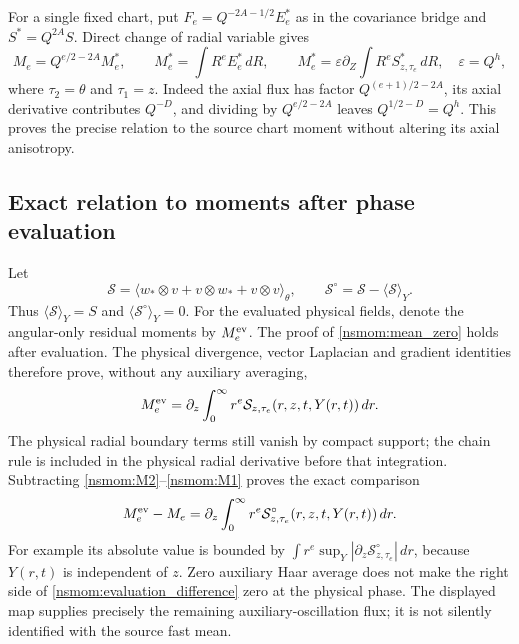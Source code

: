 \documentclass[11pt]{article}
\begin{document}
For a single fixed chart, put
$F_e=Q^{-2A-1/2}E_e^*$ as in the covariance bridge and
$S^*=Q^{2A}S$. Direct change of radial variable gives
\[
 M_e=Q^{e/2-2A}M_e^*,\qquad
 M_e^*=\int R^eE_e^*\,dR,
 \qquad
 M_e^*=\varepsilon\partial_Z\int R^e S^*_{z,\tau_e}\,dR,
 \quad\varepsilon=Q^h,
\]
where $\tau_2=\theta$ and $\tau_1=z$. Indeed the axial flux has
factor $Q^{(e+1)/2-2A}$, its axial derivative contributes $Q^{-D}$,
and dividing by $Q^{e/2-2A}$ leaves $Q^{1/2-D}=Q^h$.
This proves the precise relation to the source chart moment without
altering its axial anisotropy.

\subsection{Exact relation to moments after phase evaluation}
\label{nsmom:evaluated}
Let
\[
 \mathcal S=\langle w_*\otimes v+v\otimes w_*+v\otimes v\rangle_\theta,
 \qquad \mathcal S^\circ=\mathcal S-\langle\mathcal S\rangle_Y.
\]
Thus $\langle\mathcal S\rangle_Y=S$ and
$\langle\mathcal S^\circ\rangle_Y=0$. For the evaluated physical
fields, denote the angular-only residual moments by $M_e^{\rm ev}$.
The proof of \eqref{nsmom:mean_zero} holds after evaluation. The
physical divergence, vector Laplacian and gradient identities therefore
prove, without any auxiliary averaging,
\[
 M_e^{\rm ev}
   =\partial_z\int_0^\infty r^e
        \mathcal S_{z,\tau_e}(r,z,t,Y(r,t))\,dr.
\]
The physical radial boundary terms still vanish by compact support;
the chain rule is included in the physical radial derivative before
that integration. Subtracting \eqref{nsmom:M2}--\eqref{nsmom:M1} proves
the exact comparison
\begin{equation}
 M_e^{\rm ev}-M_e
 =\partial_z\int_0^\infty r^e
     \mathcal S^\circ_{z,\tau_e}(r,z,t,Y(r,t))\,dr.
 \label{nsmom:evaluation_difference}
\end{equation}
For example its absolute value is bounded by
$\int r^e\sup_Y|\partial_z\mathcal S^\circ_{z,\tau_e}|\,dr$,
because $Y(r,t)$ is independent of $z$. Zero auxiliary Haar average
does not make the right side of \eqref{nsmom:evaluation_difference}
zero at the physical phase. The displayed map supplies precisely the
remaining auxiliary-oscillation flux; it is not silently identified
with the source fast mean.
\end{document}
